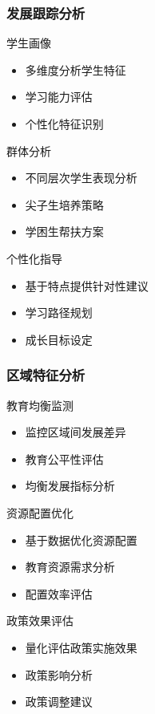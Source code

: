 \documentclass[aspectratio=169]{beamer}
\begin{document}
\begin{frame}
    \frametitle{发展跟踪分析}
    \begin{block}{学生画像}
        \begin{itemize}
            \item 多维度分析学生特征
            \item 学习能力评估
            \item 个性化特征识别
        \end{itemize}
    \end{block}
    
    \begin{block}{群体分析}
        \begin{itemize}
            \item 不同层次学生表现分析
            \item 尖子生培养策略
            \item 学困生帮扶方案
        \end{itemize}
    \end{block}
    
    \begin{block}{个性化指导}
        \begin{itemize}
            \item 基于特点提供针对性建议
            \item 学习路径规划
            \item 成长目标设定
        \end{itemize}
    \end{block}
\end{frame}

\begin{frame}
    \frametitle{区域特征分析}
    \begin{block}{教育均衡监测}
        \begin{itemize}
            \item 监控区域间发展差异
            \item 教育公平性评估
            \item 均衡发展指标分析
        \end{itemize}
    \end{block}
    
    \begin{block}{资源配置优化}
        \begin{itemize}
            \item 基于数据优化资源配置
            \item 教育资源需求分析
            \item 配置效率评估
        \end{itemize}
    \end{block}
    
    \begin{block}{政策效果评估}
        \begin{itemize}
            \item 量化评估政策实施效果
            \item 政策影响分析
            \item 政策调整建议
        \end{itemize}
    \end{block}
\end{frame}
\end{document}
